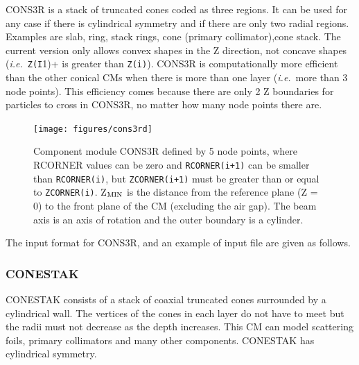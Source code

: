 \documentclass[12pt,twoside]{article}
\newcommand{\ie}{{\em i.e.}}
\begin{document}
CONS3R is a stack of truncated cones coded as three regions.  It can be used
for any case if there is cylindrical symmetry and if there are only two
radial regions. Examples are slab, ring, stack rings, cone (primary
collimator),cone stack. The current version only allows convex shapes in
the Z direction, not concave shapes (\ie\ \verb+Z(I+1)+ is greater than
\verb+Z(i)+).  CONS3R is computationally more efficient than the other
conical CMs when there is more than one layer (\ie\ more than 3 node
points). This efficiency comes because there are only 2 Z boundaries for
particles to cross in CONS3R, no matter how many node points there are.

\begin{figure}[htbp]
\begin{center}
\leavevmode
\mbox{}\hspace{0cm}
\texttt{[image: figures/cons3rd]}
\caption[CONS3R CM geometry]
{Component module CONS3R defined by 5 node points, where RCORNER values can be
zero
and {\tt RCORNER(i+1)} can be smaller than {\tt RCORNER(i)}, but {\tt ZCORNER(i+1)} must be greater than or equal
to {\tt ZCORNER(i)}.  Z$_{\rm MIN}$ is the distance from the reference plane (Z = 0) to
the
front plane of the CM (excluding the air gap). The beam axis is an axis
of rotation and the outer boundary is a cylinder.}
\label{fig_CONS3RD}
\end{center}
\end{figure}

\clearpage

The input format for CONS3R, and an example of input file are given as follows.

\begin{small}
%

\end{small}

\newpage



\subsubsection{CONESTAK}
\renewcommand{\rightmark}{CONESTAK CM}

CONESTAK consists of a stack of coaxial truncated cones
surrounded by a cylindrical wall.
The vertices of the cones in each layer do not have to meet but the
radii
must not decrease as the depth increases.  This CM can model
scattering foils,  primary collimators and many other components.
CONESTAK has cylindrical symmetry.
\end{document}
